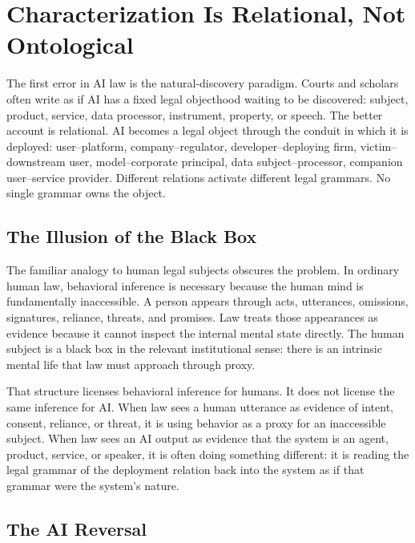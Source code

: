 \documentclass{lawreview}
\begin{document}
    \section{Characterization Is Relational, Not Ontological}

    The first error in AI law is the natural-discovery paradigm. Courts and scholars often write as if AI has a fixed legal objecthood waiting to be discovered: subject, product, service, data processor, instrument, property, or speech. The better account is relational. AI becomes a legal object through the conduit in which it is deployed: user--platform, company--regulator, developer--deploying firm, victim--downstream user, model--corporate principal, data subject--processor, companion user--service provider. Different relations activate different legal grammars. No single grammar owns the object.

    \subsection{The Illusion of the Black Box}

    The familiar analogy to human legal subjects obscures the problem. In ordinary human law, behavioral inference is necessary because the human mind is fundamentally inaccessible. A person appears through acts, utterances, omissions, signatures, reliance, threats, and promises. Law treats those appearances as evidence because it cannot inspect the internal mental state directly. The human subject is a black box in the relevant institutional sense: there is an intrinsic mental life that law must approach through proxy.

    That structure licenses behavioral inference for humans. It does not license the same inference for AI. When law sees a human utterance as evidence of intent, consent, reliance, or threat, it is using behavior as a proxy for an inaccessible subject. When law sees an AI output as evidence that the system is an agent, product, service, or speaker, it is often doing something different: it is reading the legal grammar of the deployment relation back into the system as if that grammar were the system's nature.

    \subsection{The AI Reversal}
\end{document}
